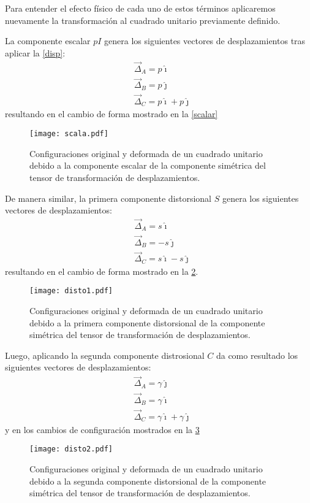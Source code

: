 \documentclass[../notas medios.tex]{subfiles}
\begin{document}
Para entender el efecto físico de cada uno de estos términos aplicaremos nuevamente la transformación al cuadrado unitario previamente definido.

La componente escalar $pI$ genera los siguientes vectores de desplazamientos 
tras aplicar la \cref{disp}:
\begin{align*}
&\vec{\Delta}_A = p\hat \imath\\
&\vec{\Delta}_B = p\hat \jmath\\
&\vec{\Delta}_C = p\hat \imath + p\hat \jmath
\end{align*}
resultando en el cambio de forma mostrado en la \cref{scalar}

\begin{figure}[H]
\centering
	\texttt{[image: scala.pdf]}
	\caption{Configuraciones original y deformada de un cuadrado unitario debido a la componente escalar de la componente simétrica del tensor de transformación de desplazamientos.}
	\label{escalar}
\end{figure}

De manera similar, la primera componente distorsional $S$ genera los siguientes 
vectores de desplazamientos:
\begin{align*}
&\vec{\Delta}_A = s\hat \imath\\
&\vec{\Delta}_B =  - s\hat \jmath\\
&\vec{\Delta}_C = s\hat \imath - s\hat \jmath
\end{align*}
resultando en el cambio de forma mostrado en la \cref{disto1}.

\begin{figure}[H]
\centering
	\texttt{[image: disto1.pdf]}
	\caption{Configuraciones original y deformada de un cuadrado unitario debido a la primera componente distorsional de la componente simétrica del tensor de transformación de desplazamientos.}
	\label{disto1}
\end{figure}

Luego, aplicando la segunda componente distrosional $C$ da como resultado los siguientes vectores de desplazamientos:
\begin{align*}
&\vec{\Delta}_A = \gamma \hat \jmath\\
&\vec{\Delta}_B = \gamma \hat \imath\\
&\vec{\Delta}_C = \gamma \hat \imath + \gamma \hat \jmath
\end{align*}
y en los cambios de configuración mostrados en la \cref{disto2}
\begin{figure}[H]
\centering
	\texttt{[image: disto2.pdf]}
	\caption{Configuraciones original y deformada de un cuadrado unitario debido a la segunda componente distorsional de la componente simétrica del tensor de transformación de desplazamientos.}
	\label{disto2}
\end{figure}
\end{document}
